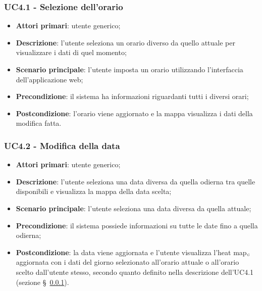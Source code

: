 \subsubsection{UC4.1 - Selezione dell’orario}\label{CasiDUsoCasiDUsoTraUnUtenteEIlFrontEndElencoCasiDUsoUC41SelezioneDellOrario}
\begin{itemize}
	\item \textbf{Attori primari}: utente generico;
	\item \textbf{Descrizione}: l’utente seleziona un orario diverso da quello attuale per visualizzare i dati di quel momento;
	\item \textbf{Scenario principale}: l’utente imposta un orario utilizzando l’interfaccia dell’applicazione web;
	\item \textbf{Precondizione}: il sistema ha informazioni riguardanti tutti i diversi orari; %
	\item \textbf{Postcondizione}:  l’orario viene aggiornato e la mappa visualizza i dati della modifica fatta.
\end{itemize}

\subsubsection{UC4.2 - Modifica della data}\label{CasiDUsoCasiDUsoTraUnUtenteEIlFrontEndElencoCasiDUsoUC42ModificaDellaData}
\begin{itemize}
	\item \textbf{Attori primari}: utente generico;
	\item \textbf{Descrizione}: l’utente seleziona una data diversa da quella odierna tra quelle disponibili e visualizza la mappa della data scelta;
	\item \textbf{Scenario principale}: l’utente seleziona una data diversa da quella attuale;
	\item \textbf{Precondizione}: il sistema possiede informazioni su tutte le date fino a quella odierna;
	\item \textbf{Postcondizione}: la data viene aggiornata e l’utente visualizza l’heat map$_{\scaleto{G}{3pt}}$ aggiornata con i dati del giorno selezionato all’orario attuale o all’orario scelto dall’utente stesso, secondo quanto definito nella descrizione dell’UC4.1 (sezione \S~\ref{CasiDUsoCasiDUsoTraUnUtenteEIlFrontEndElencoCasiDUsoUC41SelezioneDellOrario}).
\end{itemize}

